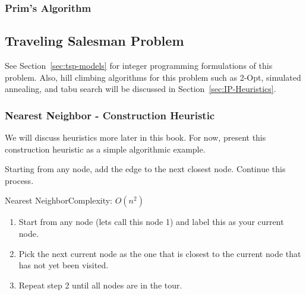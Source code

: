 

%

\subsubsection{Prim's Algorithm}


\subsection{Traveling Salesman Problem}

See Section~\ref{sec:tsp-models} for integer programming formulations of this problem.  Also, hill climbing algorithms for this problem such as 2-Opt, simulated annealing, and tabu search will be discussed in Section~\ref{sec:IP-Heuristics}.

\subsubsection{Nearest Neighbor - Construction Heuristic}

We will discuss heuristics more later in this book.   For now, present this construction heuristic as a simple algorithmic example.   


Starting from any node, add the edge to the next closest node.  Continue this process.
\begin{general}{Nearest Neighbor}{Complexity: $O(n^2)$}
\label{heuristic:nearestNeighbor}
\begin{enumerate}
\item Start from any node (lets call this node 1) and label this as your current node.
\item Pick the next current node as the one that is closest to the current node that has not yet been visited.
\item Repeat step 2 until all nodes are in the tour.
\end{enumerate}
\end{general}

